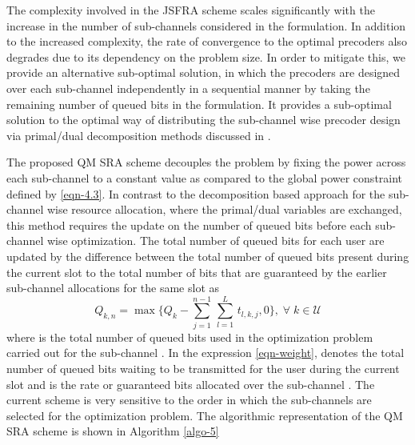 
The complexity involved in the \ac{JSFRA} scheme scales significantly with the increase in the number of sub-channels considered in the formulation. In addition to the increased complexity, the rate of convergence to the optimal precoders also degrades due to its dependency on the problem size. In order to mitigate this, we provide an alternative sub-optimal solution, in which the precoders are designed over each sub-channel independently in a sequential manner by taking the remaining number of queued bits in the formulation. It provides a sub-optimal solution to the optimal way of distributing the sub-channel wise precoder design via primal/dual decomposition methods discussed in \cite{palomar2006tutorial,boyd2011distributed}.

The proposed \acf{QM} \ac{SRA} scheme decouples the problem by fixing the power across each sub-channel to a constant value  as compared to the global power constraint defined by \eqref{eqn-4.3}. In contrast to the decomposition based approach for the sub-channel wise resource allocation, where the primal/dual variables are exchanged, this method requires the update on the number of queued bits before each sub-channel wise optimization. The total number of queued bits for each user are updated by the difference between the total number of queued bits present during the current slot to the total number of bits that are guaranteed by the earlier sub-channel allocations for the same slot as
\begin{equation}
Q_{k,n} = \max{\Big \lbrace Q_k - \sum_{j = 1}^{n-1} \, \sum_{l = 1}^{L} \, t_{l,k,j} ,0 \Big \rbrace }, \; \forall \; k \in \mathcal{U}
\label{eqn-weight}
\end{equation}
where  is the total number of queued bits used in the optimization problem carried out for the sub-channel . In the expression \eqref{eqn-weight},  denotes the total number of queued bits waiting to be transmitted for the user  during the current slot and  is the rate or guaranteed bits allocated over the sub-channel . The current scheme is very sensitive to the order in which the sub-channels are selected for the optimization problem. The algorithmic representation of the \acf{QM} \ac{SRA} scheme is shown in Algorithm \ref{algo-5}
